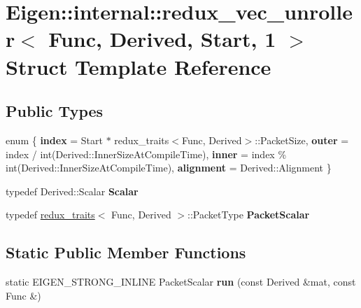 \hypertarget{struct_eigen_1_1internal_1_1redux__vec__unroller_3_01_func_00_01_derived_00_01_start_00_011_01_4}{}\section{Eigen\+::internal\+::redux\+\_\+vec\+\_\+unroller$<$ Func, Derived, Start, 1 $>$ Struct Template Reference}
\label{struct_eigen_1_1internal_1_1redux__vec__unroller_3_01_func_00_01_derived_00_01_start_00_011_01_4}
\subsection*{Public Types}
\begin{DoxyCompactItemize}
\item 
\mbox{\label{struct_eigen_1_1internal_1_1redux__vec__unroller_3_01_func_00_01_derived_00_01_start_00_011_01_4_aa7da6e3be3892e6e8ce9f8c37d31f7f0}} 
enum \{ {\bfseries index} = Start $\ast$ redux\+\_\+traits$<$Func, Derived$>$\+::Packet\+Size, 
{\bfseries outer} = index / int(Derived\+::Inner\+Size\+At\+Compile\+Time), 
{\bfseries inner} = index \% int(Derived\+::Inner\+Size\+At\+Compile\+Time), 
{\bfseries alignment} = Derived\+::Alignment
 \}
\item 
\mbox{\label{struct_eigen_1_1internal_1_1redux__vec__unroller_3_01_func_00_01_derived_00_01_start_00_011_01_4_a15445c6523f3bd3d1e58de8d39f2561e}} 
typedef Derived\+::\+Scalar {\bfseries Scalar}
\item 
\mbox{\label{struct_eigen_1_1internal_1_1redux__vec__unroller_3_01_func_00_01_derived_00_01_start_00_011_01_4_a91cc369ce48eb032480ff90f6f6ac4fb}} 
typedef \mbox{\hyperlink{struct_eigen_1_1internal_1_1redux__traits}{redux\+\_\+traits}}$<$ Func, Derived $>$\+::Packet\+Type {\bfseries Packet\+Scalar}
\end{DoxyCompactItemize}
\subsection*{Static Public Member Functions}
\begin{DoxyCompactItemize}
\item 
\mbox{\label{struct_eigen_1_1internal_1_1redux__vec__unroller_3_01_func_00_01_derived_00_01_start_00_011_01_4_a6f0e35f6097c11798930ccb12c109a98}} 
static E\+I\+G\+E\+N\+\_\+\+S\+T\+R\+O\+N\+G\+\_\+\+I\+N\+L\+I\+NE Packet\+Scalar {\bfseries run} (const Derived \&mat, const Func \&)
\end{DoxyCompactItemize}


